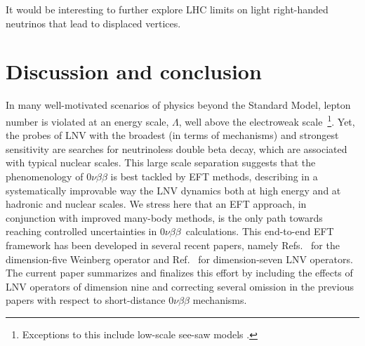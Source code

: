 \documentclass[letterpaper,11pt]{article}
\newcommand{\NLDBD}{$0 \nu \beta \beta$}
\begin{document}
It would be interesting to further explore LHC limits on light
right-handed neutrinos that lead to displaced vertices.





\section{Discussion and conclusion}\label{sec:conclude}
In many well-motivated scenarios of physics beyond the Standard Model, 
lepton number is violated  at an  energy scale, $\Lambda$, well above the electroweak 
scale~\footnote{Exceptions to this include low-scale see-saw models \cite{deGouvea:2005er}.}.
Yet,  the  probes of LNV with the broadest (in terms of mechanisms) and strongest sensitivity
are searches for neutrinoless double beta decay,  which are
associated with typical nuclear scales. This large scale separation suggests that 
 the phenomenology of $0\nu\beta\beta$  
is best tackled by EFT methods, 
describing in a systematically improvable  way the 
LNV dynamics both at high energy and 
at hadronic and nuclear scales. 
We stress here that an EFT  approach, in conjunction with improved many-body methods, 
is  the only path towards reaching controlled uncertainties in \NLDBD\  calculations. 
This end-to-end EFT framework has been developed in several recent papers,  namely 
Refs.~\cite{Cirigliano:2017tvr,Cirigliano:2018hja} for the dimension-five Weinberg operator    
and  Ref.~\cite{Cirigliano:2017djv} for dimension-seven LNV operators.
The current  paper summarizes and finalizes this effort by including the effects of LNV operators of dimension nine and correcting several omission in the previous papers with respect to short-distance $0\nu\beta\beta$  mechanisms. 
\end{document}
